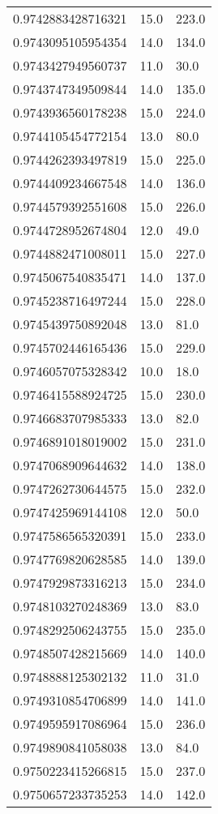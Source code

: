 \begin{center}
\begin{supertabular}[H]{p{0.30\textwidth}p{0.05\textwidth}p{0.05\textwidth}}
0.9742883428716321 & 15.0 & 223.0 \\ 
0.9743095105954354 & 14.0 & 134.0 \\ 
0.9743427949560737 & 11.0 & 30.0 \\ 
0.9743747349509844 & 14.0 & 135.0 \\ 
0.9743936560178238 & 15.0 & 224.0 \\ 
0.9744105454772154 & 13.0 & 80.0 \\ 
0.9744262393497819 & 15.0 & 225.0 \\ 
0.9744409234667548 & 14.0 & 136.0 \\ 
0.9744579392551608 & 15.0 & 226.0 \\ 
0.9744728952674804 & 12.0 & 49.0 \\ 
0.9744882471008011 & 15.0 & 227.0 \\ 
0.9745067540835471 & 14.0 & 137.0 \\ 
0.9745238716497244 & 15.0 & 228.0 \\ 
0.9745439750892048 & 13.0 & 81.0 \\ 
0.9745702446165436 & 15.0 & 229.0 \\ 
0.9746057075328342 & 10.0 & 18.0 \\ 
0.9746415588924725 & 15.0 & 230.0 \\ 
0.9746683707985333 & 13.0 & 82.0 \\ 
0.9746891018019002 & 15.0 & 231.0 \\ 
0.9747068909644632 & 14.0 & 138.0 \\ 
0.9747262730644575 & 15.0 & 232.0 \\ 
0.9747425969144108 & 12.0 & 50.0 \\ 
0.9747586565320391 & 15.0 & 233.0 \\ 
0.9747769820628585 & 14.0 & 139.0 \\ 
0.9747929873316213 & 15.0 & 234.0 \\ 
0.9748103270248369 & 13.0 & 83.0 \\ 
0.9748292506243755 & 15.0 & 235.0 \\ 
0.9748507428215669 & 14.0 & 140.0 \\ 
0.9748888125302132 & 11.0 & 31.0 \\ 
0.9749310854706899 & 14.0 & 141.0 \\ 
0.9749595917086964 & 15.0 & 236.0 \\ 
0.9749890841058038 & 13.0 & 84.0 \\ 
0.9750223415266815 & 15.0 & 237.0 \\ 
0.9750657233735253 & 14.0 & 142.0 \\ 

\end{supertabular}
\end{center}
